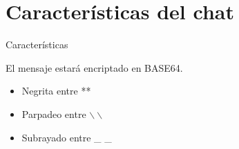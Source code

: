 \section{Características del chat}



\begin{frame}{Características}
	\begin{block}{ }
		El mensaje estará encriptado en BASE64.
	\end{block}
	
	\begin{block}{ }
		\begin{itemize}
			\item Negrita entre **
			\item Parpadeo entre $\backslash \backslash$
			\item Subrayado entre \_ \_
		\end{itemize}
	\end{block}

\end{frame}